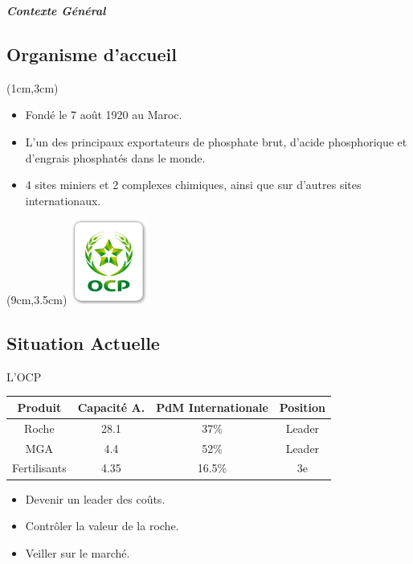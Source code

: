 \documentclass[handout]{beamer}
\begin{document}
\begin{frame}
	\begin{center}
		\Huge \textbf{\textit{Contexte Général}}
	\end{center}
\end{frame}

\subsection{Organisme d’accueil}
\begin{frame}
	\begin{textblock*}{7cm}(1cm,3cm)
		\begin{itemize}
			\item Fondé le 7 août 1920 au Maroc.
			\item L'un des principaux exportateurs de phosphate brut, d’acide phosphorique et d’engrais phosphatés dans le monde.
			\item 4 sites miniers et 2 complexes chimiques, ainsi que sur d'autres sites internationaux.
		\end{itemize}
	\end{textblock*}
	
	\begin{textblock*}{5cm}(9cm,3.5cm) %
		\includegraphics[width=2.5cm]{logo-ocp}
	\end{textblock*}
\end{frame}


\subsection{Situation Actuelle}
\begin{frame}
\begin{block}{L'OCP}
\begin{table}
\centering 
  \begin{tabular}{|c|c|c|c|}
  \hline
  \small{Produit} & \small{Capacité A.} & \small{PdM Internationale} & \small{Position} \\
  \hline
  Roche & 28.1 & 37\% & Leader\\
  MGA & 4.4 & 52\% & Leader\\
  Fertilisants & 4.35 & 16.5\% & 3e\\
  \hline
  \end{tabular}
  \end{table}
  \begin{itemize}
  \item Devenir un leader des coûts.
  \item	Contrôler la valeur de la roche.
  \item Veiller sur le marché.
  \end{itemize}
  \end{block} 
\end{frame}
\end{document}
